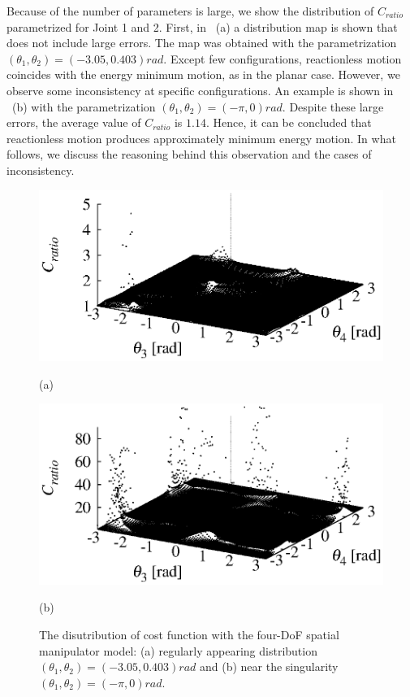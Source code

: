 Because of the number of parameters is large, 
we show the distribution of $C_{ratio}$ parametrized for Joint 1 and 2.
First, in ~(a)  a distribution map is shown that  does not include large errors. 
The map was obtained with the parametrization $(\theta_{1}, \theta_{2}) = (-3.05,0.403)\unit{rad}$.
Except few configurations, 
reactionless motion coincides with the energy minimum motion, as  in the planar case.
However, we observe some inconsistency at specific configurations.
An example is shown in ~(b) with the parametrization $(\theta_{1},\theta_{2}) = (-\pi,0)\unit{rad}$.
Despite these large errors, the average value of $C_{ratio}$ is $1.14$.
Hence, it can be concluded that reactionless motion produces approximately minimum energy motion.
In what follows, we discuss the reasoning behind this observation and the cases of inconsistency.
%
\begin{figure}[t]
  \centering
  \begin{minipage}[t]{0.495\linewidth}
    \centering
    \includegraphics[width=1.0\linewidth]{fig/chapter5/analysis/err-3.05183_0.403919.eps}
    \footnotesize\par{(a)}
  \end{minipage}
  \begin{minipage}[t]{0.495\linewidth}
    \centering
    \includegraphics[width=1.0\linewidth]{fig/chapter5/analysis/err-3.14159_0.eps}
    \footnotesize\par{(b)}
  \end{minipage}
  \caption{The disutribution of cost function with the four-DoF spatial manipulator model:
  (a) regularly appearing distribution $(\theta_{1},\theta_{2}) = (-3.05,0.403)\unit{rad}$
  and (b) near the singularity $(\theta_{1},\theta_{2}) = (-\pi,0)\unit{rad}$.}
\label{fig:dist_3d}
\end{figure}
